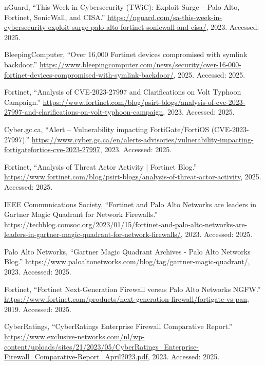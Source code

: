 \documentclass[12pt]{article}
\begin{document}
\begin{thebibliography}{10}
{nGuard}, ``{This Week in Cybersecurity (TWiC): Exploit Surge – Palo Alto,
  Fortinet, SonicWall, and CISA}.''
  \url{https://nguard.com/sa-this-week-in-cybersecurity-exploit-surge-palo-alto-fortinet-sonicwall-and-cisa/},
  2023.
\newblock Accessed: 2025.

{BleepingComputer}, ``{Over 16,000 Fortinet devices compromised with symlink
  backdoor}.''
  \url{https://www.bleepingcomputer.com/news/security/over-16-000-fortinet-devices-compromised-with-symlink-backdoor/},
  2025.
\newblock Accessed: 2025.

{Fortinet}, ``{Analysis of CVE-2023-27997 and Clarifications on Volt Typhoon
  Campaign}.''
  \url{https://www.fortinet.com/blog/psirt-blogs/analysis-of-cve-2023-27997-and-clarifications-on-volt-typhoon-campaign},
  2023.
\newblock Accessed: 2025.

{Cyber.gc.ca}, ``{Alert – Vulnerability impacting FortiGate/FortiOS
  (CVE-2023-27997)}.''
  \url{https://www.cyber.gc.ca/en/alerts-advisories/vulnerability-impacting-fortigatefortios-cve-2023-27997},
  2023.
\newblock Accessed: 2025.

{Fortinet}, ``{Analysis of Threat Actor Activity | Fortinet Blog}.''
  \url{https://www.fortinet.com/blog/psirt-blogs/analysis-of-threat-actor-activity},
  2025.
\newblock Accessed: 2025.

{IEEE Communications Society}, ``{Fortinet and Palo Alto Networks are leaders
  in Gartner Magic Quadrant for Network Firewalls}.''
  \url{https://techblog.comsoc.org/2023/01/15/fortinet-and-palo-alto-networks-are-leaders-in-gartner-magic-quadrant-for-network-firewalls/},
  2023.
\newblock Accessed: 2025.

{Palo Alto Networks}, ``{Gartner Magic Quadrant Archives - Palo Alto Networks
  Blog}.''
  \url{https://www.paloaltonetworks.com/blog/tag/gartner-magic-quadrant/},
  2023.
\newblock Accessed: 2025.

{Fortinet}, ``{Fortinet Next-Generation Firewall versus Palo Alto Networks
  NGFW}.''
  \url{https://www.fortinet.com/products/next-generation-firewall/fortigate-vs-pan},
  2019.
\newblock Accessed: 2025.

{CyberRatings}, ``{CyberRatings Enterprise Firewall Comparative Report}.''
  \url{https://www.exclusive-networks.com/nl/wp-content/uploads/sites/21/2023/05/CyberRatings_Enterprise-Firewall_Comparative-Report_April2023.pdf},
  2023.
\newblock Accessed: 2025.


\end{thebibliography}
\end{document}
